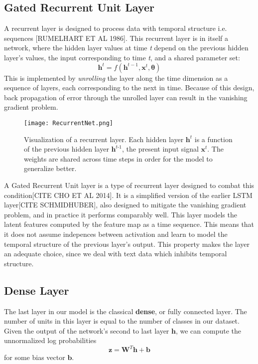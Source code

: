 \subsection{Gated Recurrent Unit Layer}
A recurrent layer is designed to process data with temporal structure i.e. sequences [RUMELHART ET AL 1986].
This recurrent layer is in itself a network, where the hidden layer values at time \textit{t} depend on the previous
hidden layer's values, the input corresponding to time \textit{t}, and a shared parameter set:
\[\bm{h}^{t} = f(\bm{h}^{t-1}, \bm{x}^{t}, \bm{\theta})\]
This is implemented by \textit{unrolling} the layer along the time dimension as a sequence of layers, each corresponding
to the next in time. Because of this design, back propagation of error through the unrolled layer can result
in the vanishing gradient problem.

\begin{figure}[H]
\caption{Visualization of a recurrent layer. Each hidden layer $\bm{h}^{\textit{t}}$ is a function of the previous hidden
layer $\bm{h}^{\textit{t-1}}$, the present input signal $\bm{x}^{\textit{t}}$. The weights are shared across time steps
in order for the model to generalize better.}
\centering
\texttt{[image: RecurrentNet.png]}
\end{figure}

A Gated Recurrent Unit layer is a type of recurrent layer designed to combat this condition[CITE CHO ET AL 2014].
It is a simplified version of the earlier LSTM layer[CITE SCHMIDHUBER], also designed to mitigate the vanishing gradient problem,
and in practice it performs comparably well.
This layer models the latent features computed by the feature map as a time sequence. This means that it
does not assume indepences between activation and learn to model the temporal structure of the previous
layer's output. This property makes the layer an adequate choice, since we deal with text data which inhibits
temporal structure.

\subsection{Dense Layer}
The last layer in our model is the classical \textbf{dense}, or fully connected layer.
The number of units in this layer is equal to the number of classes in our dataset.
Given the output of the network's second to last layer $\bm{h}$, we can compute the unnormalized log probabilities
\[\bm{z} = \bm{W}^{T}\bm{h} + \bm{b}\]
for some bias vector $\bm{b}$.



